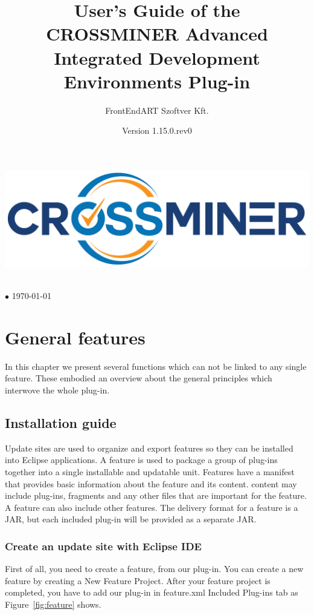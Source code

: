 \documentclass[11pt,a4paper]{book}
\author{FrontEndART Szoftver Kft.}
\title{User's Guide of the CROSSMINER Advanced Integrated Development Environments Plug-in}
\date{Version 1.15.0.rev0}
\makeatletter
\renewcommand{\maketitle}{
\vspace*{.1\textheight}
\begin{center}
	\includegraphics[width=.6\textwidth]{pic/CROSSMINER-logo-large.png}
\end{center}
\begin{center}
	\Huge\@title
\end{center}
\vfill
\begin{center}
	\large\@author\\\@date{} $\bullet$ \today
\end{center}
}
\makeatother
\begin{document}
	
\begin{titlepage}
	\maketitle
\end{titlepage}

\tableofcontents

\chapter{General features}

In this chapter we present several functions which can not be linked to any single feature.
These embodied an overview about the general principles which interwove the whole plug-in.

\section{Installation guide}
Update sites are used to organize and export features so they can be installed into Eclipse applications. A feature is used to package a group of plug-ins together into a single installable and updatable unit. Features have a manifest that provides basic information about the feature and its content. content may include plug-ins, fragments and any other files that are important for the feature. A feature can also include other features. The delivery format for a feature is a JAR, but each included plug-in will be provided as a separate JAR.

\subsection{Create an update site with Eclipse IDE}

First of all, you need to create a feature, from our plug-in. You can create a new feature by creating a New Feature Project. After your feature project is completed, you have to add our plug-in in feature.xml Included Plug-ins tab as Figure~\ref{fig:feature} shows.
\end{document}
